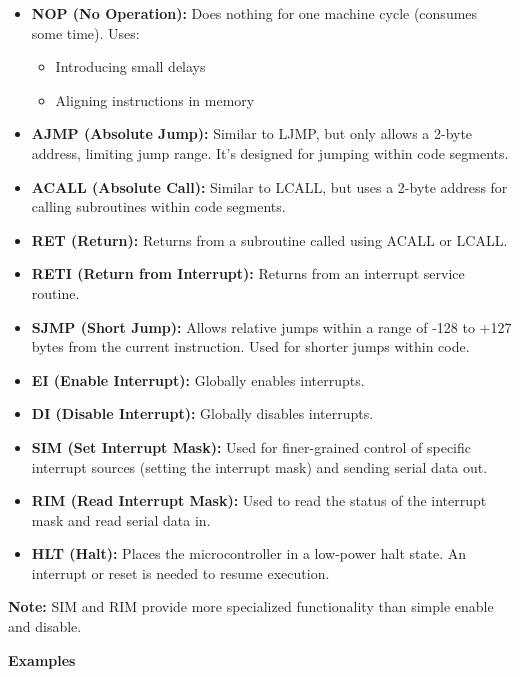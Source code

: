 \documentclass[
]{article}
\begin{document}
\begin{itemize}
\item
  \textbf{NOP (No Operation):} Does nothing for one machine cycle
  (consumes some time). Uses:

  \begin{itemize}
  \item
    Introducing small delays
  \item
    Aligning instructions in memory
  \end{itemize}
\item
  \textbf{AJMP (Absolute Jump):} Similar to LJMP, but only allows a
  2-byte address, limiting jump range. It's designed for jumping within
  code segments.
\item
  \textbf{ACALL (Absolute Call):} Similar to LCALL, but uses a 2-byte
  address for calling subroutines within code segments.
\item
  \textbf{RET (Return):} Returns from a subroutine called using ACALL or
  LCALL.
\item
  \textbf{RETI (Return from Interrupt):} Returns from an interrupt
  service routine.
\item
  \textbf{SJMP (Short Jump):} Allows relative jumps within a range of
  -128 to +127 bytes from the current instruction. Used for shorter
  jumps within code.
\item
  \textbf{EI (Enable Interrupt):} Globally enables interrupts.
\item
  \textbf{DI (Disable Interrupt):} Globally disables interrupts.
\item
  \textbf{SIM (Set Interrupt Mask):} Used for finer-grained control of
  specific interrupt sources (setting the interrupt mask) and sending
  serial data out.
\item
  \textbf{RIM (Read Interrupt Mask):} Used to read the status of the
  interrupt mask and read serial data in.
\item
  \textbf{HLT (Halt):} Places the microcontroller in a low-power halt
  state. An interrupt or reset is needed to resume execution.
\end{itemize}

\textbf{Note:} SIM and RIM provide more specialized functionality than
simple enable and disable.

\textbf{Examples}
\end{document}
